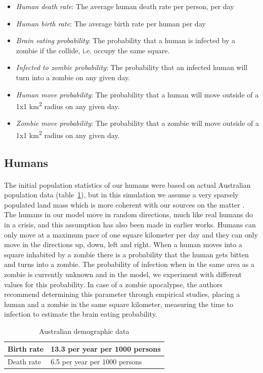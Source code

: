 \documentclass{article}
\begin{document}
\begin{itemize}
\item \emph{Human death rate}: The average human death rate per person, per day
\item \emph{Human birth rate}: The average birth rate per human per day
\item \emph{Brain eating probability}: The probability that a human is infected by a zombie if the collide, i.e. occupy the same square.
\item \emph{Infected to zombie probability}: The probability that an infected human will turn into a zombie on any given day.
\item \emph{Human move probability}: The probability that a human will move outside of a 1x1 km\textsuperscript{2} radius on any given day.
\item \emph{Zombie move probability}: The probability that a zombie will move outside of a 1x1 km\textsuperscript{2} radius on any given day.
\end{itemize}

\subsection{Humans}
\paragraph{}
The initial population statistics of our humans were based on actual Australian population data (table~\ref{AustralianData}), but in this simulation we assume a very sparsely populated land mass which is more coherent with our sources on the matter\cite{zombieland} . The humans in our model move in random directions, much like real humans do in a crisis, and this assumption has also been made in earlier works\cite{munz}. Humans can only move at a maximum pace of one square kilometer per day and they can only move in the directions up, down, left and right. When a human moves into a square inhabited by a zombie there is a probability that the human gets bitten and turns into a zombie. The probability of infection when in the same area as a zombie is currently unknown and in the model, we experiment with different values for this probability. In case of a zombie apocalypse, the authors recommend determining this parameter through empirical studies, placing a human and a zombie in the same square kilometer, measuring the time to infection to estimate the brain eating probability.
\begin{table}[h!]
\centering
    \begin{tabular}{|l|l|}
      \hline
        Birth rate & 13.3 per year per 1000 persons \\
      \hline
        Death rate & 6.5 per year per 1000 persons \\
      \hline
\end{tabular}
\caption{Australian demographic data}\label{AustralianData}
\end{table}
\end{document}
